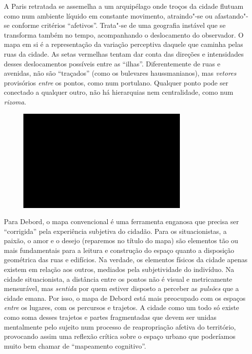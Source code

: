 A Paris retratada se assemelha a um arquipélago onde troços da cidade
flutuam como num ambiente líquido em constante movimento, atraindo"-se ou
afastando"-se conforme critérios ``afetivos''. Trata"-se de uma geografia
instável que se transforma também no tempo, acompanhando o deslocamento
do observador. O mapa em si é a representação da variação perceptiva
daquele que caminha pelas ruas da cidade. As setas vermelhas tentam dar
conta das direções e intensidades desses deslocamentos possíveis entre
as ``ilhas''. Diferentemente de ruas e avenidas, não são ``traçados''
(como os bulevares haussmanianos), mas \emph{vetores} provisórios
\emph{entre} os pontos, como num portulano. Qualquer ponto pode ser
conectado a qualquer outro, não há hierarquias nem centralidade, como
num \emph{rizoma}.

\begin{figure}[!ht]
\centering
 \includegraphics[width=85mm]{./imgs/im1.jpg}
\caption{\tiny{}}
\end{figure}

Para Debord, o mapa convencional é uma ferramenta enganosa que precisa
ser ``corrigida'' pela experiência subjetiva do cidadão. Para os
situacionistas, a paixão, o amor e o desejo (reparemos no título do
mapa) são elementos tão ou mais fundamentais para a leitura e construção
do espaço quanto a disposição geométrica das ruas e edifícios. Na
verdade, os elementos físicos da cidade apenas existem em relação aos
outros, mediados pela subjetividade do indivíduo. Na cidade
situacionista, a distância entre os pontos não é visual e metricamente
mensurável, mas \emph{sentida} por quem estiver disposto a perceber as
\emph{pulsões} que a cidade emana. Por isso, o mapa de Debord está mais
preocupado com os espaços \emph{entre} os lugares, com os percursos e
trajetos. A cidade como um todo só existe como soma desses trajetos e
partes fragmentadas que devem ser unidas mentalmente pelo sujeito num
processo de reapropriação afetiva do território, provocando assim uma
reflexão crítica sobre o espaço urbano que poderíamos muito bem chamar
de ``mapeamento cognitivo''.

